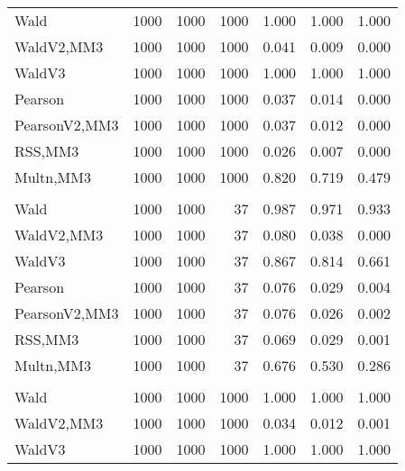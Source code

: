 \documentclass[
]{article}
\begin{document}
\begin{table}[H]
{\begin{tabular}[t]{lrrrrrr}
\hspace{1em}Wald & 1000 & 1000 & 1000 & 1.000 & 1.000 & \vphantom{1} 1.000\\
\hspace{1em}WaldV2,MM3 & 1000 & 1000 & 1000 & 0.041 & 0.009 & 0.000\\
\hspace{1em}WaldV3 & 1000 & 1000 & 1000 & 1.000 & 1.000 & \vphantom{1} 1.000\\
\hspace{1em}Pearson & 1000 & 1000 & 1000 & 0.037 & 0.014 & 0.000\\
\hspace{1em}PearsonV2,MM3 & 1000 & 1000 & 1000 & 0.037 & 0.012 & 0.000\\
\hspace{1em}RSS,MM3 & 1000 & 1000 & 1000 & 0.026 & 0.007 & 0.000\\
\hspace{1em}Multn,MM3 & 1000 & 1000 & 1000 & 0.820 & 0.719 & 0.479\\
\addlinespace[0.3em]
\multicolumn{7}{l}{\textbf{2F 10V}}\\
\hspace{1em}Wald & 1000 & 1000 & 37 & 0.987 & 0.971 & 0.933\\
\hspace{1em}WaldV2,MM3 & 1000 & 1000 & 37 & 0.080 & 0.038 & 0.000\\
\hspace{1em}WaldV3 & 1000 & 1000 & 37 & 0.867 & 0.814 & 0.661\\
\hspace{1em}Pearson & 1000 & 1000 & 37 & 0.076 & 0.029 & 0.004\\
\hspace{1em}PearsonV2,MM3 & 1000 & 1000 & 37 & 0.076 & 0.026 & 0.002\\
\hspace{1em}RSS,MM3 & 1000 & 1000 & 37 & 0.069 & 0.029 & 0.001\\
\hspace{1em}Multn,MM3 & 1000 & 1000 & 37 & 0.676 & 0.530 & 0.286\\
\addlinespace[0.3em]
\multicolumn{7}{l}{\textbf{3F 15V}}\\
\hspace{1em}Wald & 1000 & 1000 & 1000 & 1.000 & 1.000 & 1.000\\
\hspace{1em}WaldV2,MM3 & 1000 & 1000 & 1000 & 0.034 & 0.012 & 0.001\\
\hspace{1em}WaldV3 & 1000 & 1000 & 1000 & 1.000 & 1.000 & 1.000\\

\end{tabular}}
\end{table}
\end{document}
